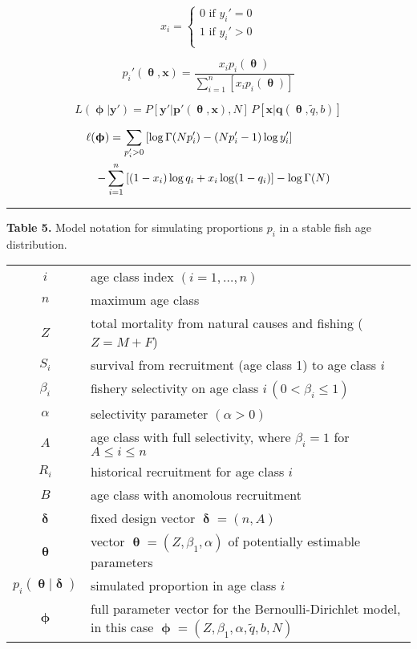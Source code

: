 \documentclass[12pt,fleqn,letterpaper]{article}
\def\noi{\noindent}
\def\newp{\vfill \break}   %
\def\beq{\begin{equation}}
\def\eeq{\end{equation}}
\def\dst{\displaystyle}
\def\bfpp{\mathbf{p'}}
\def\bfq{\mathbf{q}}
\def\bfx{\mathbf{x}}
\def\bfyp{\mathbf{y'}}
\def\bfth{\bm{\uptheta}}
\def\bfph{\bm{\upphi}}
\def\bfdel{\bm{\updelta}}
\def\al{\alpha}
\def\bt{\beta}
\def\Gam{\Gamma}
\def\qtil{\tilde{q}}
\begin{document}
  
\beq x_i = \left\{ \begin{array}{l}
  0 \mbox{\ if\ } y_i'=0 \\
  1 \mbox{\ if\ } y_i'>0 \\
\end{array} \right. \label{xobs} \eeq

 
\beq p_i'(\bfth,\bfx) = \frac{x_i p_i(\bfth)}{\dst \sum_{i=1}^n [x_i p_i(\bfth)]} \label{pip2} \eeq

 
\beq L(\bfph|\bfyp) = P[\bfyp|\bfpp(\bfth,\bfx),N] \, P[\bfx|\bfq(\bfth,\qtil,b)]  \label{L} \eeq

\begin{eqnarray} 
  \lefteqn{\ell(\bfph) = \sum_{p_i'>0} \left[\log \Gam(Np_i') 
     - (Np_i'-1) \log y_i' \right]} \label{ell} \\
  && - \sum_{i=1}^n \left[(1-x_i) \log q_i + x_i \log(1-q_i) \right] - \log \Gam(N)
  \nonumber \end{eqnarray}

\hrule \newp


\noi \textbf{Table 5.} Model notation for simulating proportions $p_i$ in a stable fish age distribution. \\

\noi \begin{tabular}{cp{5.3in}}
\hline
  $i$ & age class index $(i=1,\ldots,n)$ \\
  $n$ & maximum age class \\
  $Z$ & total mortality from natural causes and fishing ($Z=M+F$) \\
  $S_i$ & survival from recruitment (age class 1) to age class $i$\\
  $\bt_i$ & fishery selectivity on age class $i$\,$(0<\bt_i\leq 1)$ \\
  $\al$ & selectivity parameter $(\al>0)$ \\
  $A$ & age class with full selectivity, where $\bt_i=1$ for $A \leq i \leq n$ \\
  $R_i$ & historical recruitment for age class $i$ \\
  $B$ & age class with anomolous recruitment \\
  $\bfdel$ & fixed design vector $\bfdel = (n,A)$ \\
  $\bfth$ & vector $\bfth = (Z,\bt_1,\al)$ of potentially estimable parameters \\
  $p_i(\bfth|\bfdel)$ & simulated proportion in age class $i$ \\
  $\bfph$ & full parameter vector for the Bernoulli-Dirichlet model, in this case
    $\bfph = (Z,\bt_1,\al,\qtil,b,N)$ \\
\hline
\end{tabular} \\[4ex]
\end{document}
